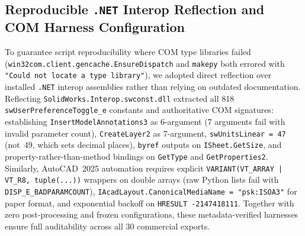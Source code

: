 \documentclass[nocopyright,nolists,upint,varvw,hyphenate]{asmejour}
\begin{document}
\subsection{Reproducible \texttt{.NET} Interop Reflection and COM Harness Configuration}\label{sec:supp_reflection}

To guarantee script reproducibility where COM type libraries failed (\texttt{win32com.\allowbreak client.\allowbreak gencache.\allowbreak EnsureDispatch} and \texttt{makepy} both errored with \texttt{"Could not locate a type library"}), we adopted direct reflection over installed \texttt{.NET} interop assemblies rather than relying on outdated documentation. Reflecting \texttt{SolidWorks.\allowbreak Interop.\allowbreak swconst.dll} extracted all 818 \texttt{swUserPreference\allowbreak Toggle\_e} constants and authoritative COM signatures: establishing \texttt{InsertModel\allowbreak Annotations3} as 6-argument (7 arguments fail with invalid parameter count), \texttt{CreateLayer2} as 7-argument, \texttt{swUnitsLinear = 47} (not~49, which sets decimal places), \texttt{byref} outputs on \texttt{ISheet.\allowbreak GetSize}, and property-rather-than-method bindings on \texttt{GetType} and \texttt{GetProperties2}. Similarly, AutoCAD~2025 automation requires explicit \texttt{VARIANT(\allowbreak VT\_ARRAY | VT\_R8, \allowbreak tuple(...))} wrappers on double arrays (raw Python lists fail with \texttt{DISP\_E\_\allowbreak BADPARAMCOUNT}), \texttt{IAcadLayout.\allowbreak Canonical\allowbreak MediaName = "psk:ISOA3"} for paper format, and exponential backoff on \texttt{HRESULT -2147418111}. Together with zero post-processing and frozen configurations, these metadata-verified harnesses ensure full auditability across all 30 commercial exports.
\end{document}
